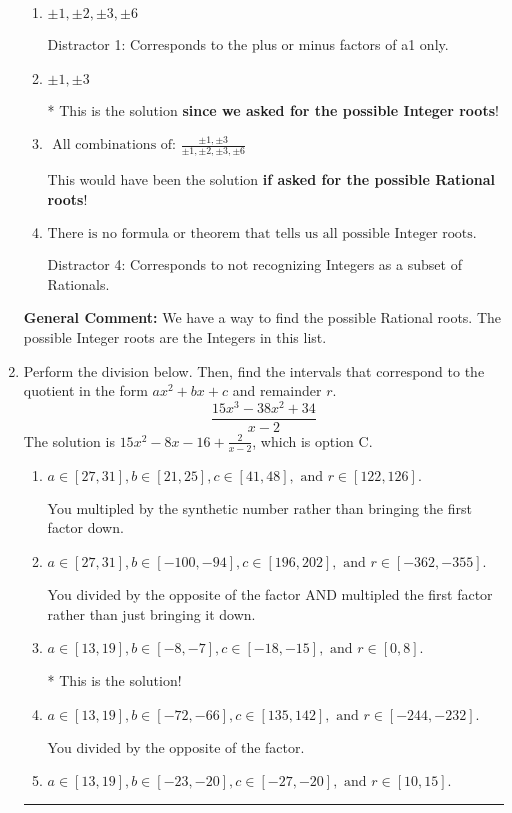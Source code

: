 \documentclass{extbook}[14pt]
\newcommand{\litem}[1]{\item #1

\rule{\textwidth}{0.4pt}}
\begin{document}
\begin{enumerate}
{\begin{enumerate}[label=\Alph*.]
 Distractor 3: Corresponds to the plus or minus of the inverse quotient (an/a0) of the factors. 
\item \( \pm 1,\pm 2,\pm 3,\pm 6 \)

 Distractor 1: Corresponds to the plus or minus factors of a1 only.
\item \( \pm 1,\pm 3 \)

* This is the solution \textbf{since we asked for the possible Integer roots}!
\item \( \text{ All combinations of: }\frac{\pm 1,\pm 3}{\pm 1,\pm 2,\pm 3,\pm 6} \)

This would have been the solution \textbf{if asked for the possible Rational roots}!
\item \( \text{There is no formula or theorem that tells us all possible Integer roots.} \)

 Distractor 4: Corresponds to not recognizing Integers as a subset of Rationals.
\end{enumerate}

\textbf{General Comment:} We have a way to find the possible Rational roots. The possible Integer roots are the Integers in this list.
}
\litem{
Perform the division below. Then, find the intervals that correspond to the quotient in the form $ax^2+bx+c$ and remainder $r$.
\[ \frac{15x^{3} -38 x^{2} + 34}{x -2} \]The solution is \( 15x^{2} -8 x -16 + \frac{2}{x -2} \), which is option C.\begin{enumerate}[label=\Alph*.]
\item \( a \in [27, 31], b \in [21, 25], c \in [41, 48], \text{ and } r \in [122, 126]. \)

 You multipled by the synthetic number rather than bringing the first factor down.
\item \( a \in [27, 31], b \in [-100, -94], c \in [196, 202], \text{ and } r \in [-362, -355]. \)

 You divided by the opposite of the factor AND multipled the first factor rather than just bringing it down.
\item \( a \in [13, 19], b \in [-8, -7], c \in [-18, -15], \text{ and } r \in [0, 8]. \)

* This is the solution!
\item \( a \in [13, 19], b \in [-72, -66], c \in [135, 142], \text{ and } r \in [-244, -232]. \)

 You divided by the opposite of the factor.
\item \( a \in [13, 19], b \in [-23, -20], c \in [-27, -20], \text{ and } r \in [10, 15]. \)


\end{enumerate}}
\end{enumerate}
\end{document}
